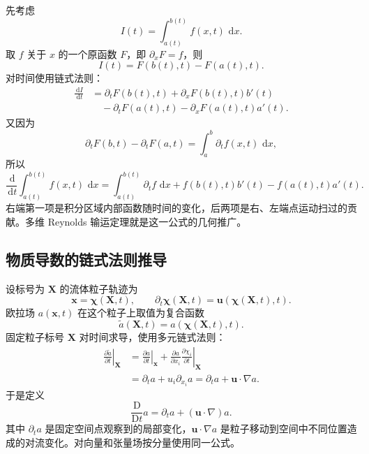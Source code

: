 \documentclass[cn,hazy,blue,11pt,normal]{elegantnote}
\numberwithin{equation}{section}
\newcommand{\dd}{\,\mathrm d}
\newcommand{\Dt}{\frac{\mathrm D}{\mathrm Dt}}
\newcommand{\vct}[1]{\bm{#1}}
\begin{document}
先考虑
\begin{equation}
 I(t)=\int_{a(t)}^{b(t)}f(x,t)\,\dd x.
\end{equation}
取 $f$ 关于 $x$ 的一个原函数 $F$，即 $\partial_xF=f$，则
\begin{equation}
 I(t)=F(b(t),t)-F(a(t),t).
\end{equation}
对时间使用链式法则：
\begin{align}
 \frac{\dd I}{\dd t}
 &=\partial_tF(b(t),t)+\partial_xF(b(t),t)b'(t)\\
 &\quad-\partial_tF(a(t),t)-\partial_xF(a(t),t)a'(t).
\end{align}
又因为
\begin{equation}
 \partial_tF(b,t)-\partial_tF(a,t)
 =\int_a^b\partial_tf(x,t)\,\dd x,
\end{equation}
所以
\begin{equation}
 \boxed{\frac{\dd}{\dd t}\int_{a(t)}^{b(t)}f(x,t)\,\dd x
 =\int_{a(t)}^{b(t)}\partial_tf\,\dd x
 +f(b(t),t)b'(t)-f(a(t),t)a'(t).} \label{eq:leibniz-1d}
\end{equation}
右端第一项是积分区域内部函数随时间的变化，后两项是右、左端点运动扫过的贡献。多维 Reynolds 输运定理就是这一公式的几何推广。

\subsection{物质导数的链式法则推导}

设标号为 $\vct X$ 的流体粒子轨迹为
\begin{equation}
 \vct x=\vct\chi(\vct X,t),
 \qquad \partial_t\vct\chi(\vct X,t)=\vct u(\vct\chi(\vct X,t),t).
\end{equation}
欧拉场 $a(\vct x,t)$ 在这个粒子上取值为复合函数
\begin{equation}
 \widetilde a(\vct X,t)=a(\vct\chi(\vct X,t),t).
\end{equation}
固定粒子标号 $\vct X$ 对时间求导，使用多元链式法则：
\begin{align}
 \left.\frac{\partial\widetilde a}{\partial t}\right|_{\vct X}
 &=\left.\frac{\partial a}{\partial t}\right|_{\vct x}
 +\frac{\partial a}{\partial x_i}
   \left.\frac{\partial\chi_i}{\partial t}\right|_{\vct X}\\
 &=\partial_ta+u_i\partial_{x_i}a
 =\partial_ta+\vct u\cdot\nabla a.
\end{align}
于是定义
\begin{equation}
 \boxed{\Dt a=\partial_ta+(\vct u\cdot\nabla)a.} \label{eq:material-derivative-detail}
\end{equation}
其中 $\partial_ta$ 是固定空间点观察到的局部变化，$\vct u\cdot\nabla a$ 是粒子移动到空间中不同位置造成的对流变化。对向量和张量场按分量使用同一公式。
\end{document}
